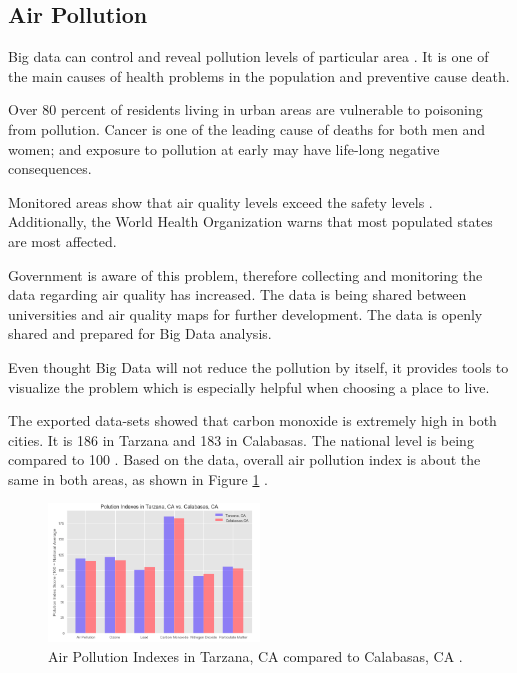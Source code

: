 \documentclass[sigconf]{acmart}
\begin{document}
\subsection{Air Pollution}

Big data can control and reveal pollution levels of particular area \cite{pollution}. It is one of the main causes of health problems in the population and preventive cause death.

Over 80 percent of residents living in urban areas are vulnerable to poisoning from pollution.  Cancer is one of the leading cause of deaths for both men and women; and exposure to pollution at early may have life-long negative consequences.  

Monitored areas show that air quality levels exceed the safety levels \cite{pollution2}. Additionally, the World Health Organization warns that most populated states are most affected.

Government is aware of this problem, therefore collecting and monitoring the data regarding air quality has increased. The data is being shared between universities and air quality maps for further development. The data is openly shared and prepared for Big Data analysis.

Even thought Big Data will not reduce the pollution by itself, it provides tools to visualize the problem which is especially helpful when choosing a place to live.

The exported data-sets showed \cite{md} that carbon monoxide is extremely high in both cities. It is 186 in Tarzana and 183 in Calabasas. The national level is being compared to 100 \cite{clr}. Based on the data, overall air pollution index is about the same in both areas, as shown in Figure \ref{fig:figure4} \cite{md}.

\begin{figure}
  \centering
  \includegraphics[width=0.5\textwidth]{images/figure4.png}
  \caption{Air Pollution Indexes in Tarzana, CA compared to Calabasas, CA \cite{md}.} \label{fig:figure4} 
\end{figure}
\end{document}
